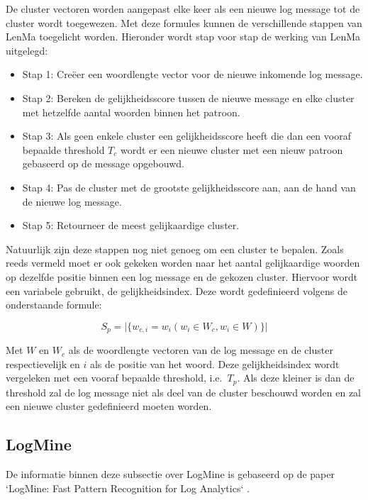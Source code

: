 De cluster vectoren worden aangepast elke keer als een nieuwe log message tot de cluster wordt toegewezen. Met deze formules kunnen de verschillende stappen van LenMa toegelicht worden. Hieronder wordt stap voor stap de werking van LenMa uitgelegd:
\begin{itemize}
    \item Stap 1: Creëer een woordlengte vector voor de nieuwe inkomende log message.
    \item Stap 2: Bereken de gelijkheidsscore tussen de nieuwe message en elke cluster met hetzelfde aantal woorden binnen het patroon.
    \item Stap 3: Als geen enkele cluster een gelijkheidsscore heeft die dan een vooraf bepaalde threshold \(T_{c}\) wordt er een nieuwe cluster met een nieuw patroon gebaseerd op de message opgebouwd.
    \item Stap 4: Pas de cluster met de grootste gelijkheidsscore aan, aan de hand van de nieuwe log message. 
    \item Stap 5: Retourneer de meest gelijkaardige cluster.
\end{itemize}

Natuurlijk zijn deze stappen nog niet genoeg om een cluster te bepalen. Zoals reeds vermeld moet er ook gekeken worden naar het aantal gelijkaardige woorden op dezelfde positie binnen een log message en de gekozen cluster. Hiervoor wordt een variabele gebruikt, de gelijkheidsindex. Deze wordt gedefinieerd volgens de onderstaande formule: 

\[S_{p} = \lvert \{w_{c,i} = w_{i}(w_{i} \in W_{c}, w_{i} \in W)\} \rvert\]

Met \(W\) en \(W_{c}\) als de woordlengte vectoren van de log message en de cluster respectievelijk en $i$ als de positie van het woord. Deze gelijkheidsindex wordt vergeleken met een vooraf bepaalde threshold, i.e.\ \(T_{p}\). Als deze kleiner is dan de threshold zal de log message niet als deel van de cluster beschouwd worden en zal een nieuwe cluster gedefinieerd moeten worden.

\subsection{LogMine}
De informatie binnen deze subsectie over LogMine is gebaseerd op de paper `LogMine: Fast Pattern Recognition for Log Analytics` \autocite{hamooni2016logmine}.

